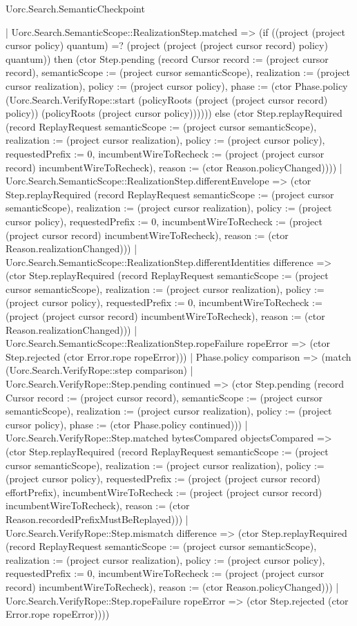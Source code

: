 \begin{lexlean}{Uorc.Search.SemanticCheckpoint}
\begin{semanticmodule}
{      | Uorc.Search.SemanticScope::RealizationStep.matched => (if ((project (project cursor policy) quantum) =? (project (project (project cursor record) policy) quantum)) then (ctor Step.pending (record Cursor {record := (project cursor record), semanticScope := (project cursor semanticScope), realization := (project cursor realization), policy := (project cursor policy), phase := (ctor Phase.policy (Uorc.Search.VerifyRope::start (policyRoots (project (project cursor record) policy)) (policyRoots (project cursor policy))))})) else (ctor Step.replayRequired (record ReplayRequest {semanticScope := (project cursor semanticScope), realization := (project cursor realization), policy := (project cursor policy), requestedPrefix := 0, incumbentWireToRecheck := (project (project cursor record) incumbentWireToRecheck), reason := (ctor Reason.policyChanged)})))
      | Uorc.Search.SemanticScope::RealizationStep.differentEnvelope => (ctor Step.replayRequired (record ReplayRequest {semanticScope := (project cursor semanticScope), realization := (project cursor realization), policy := (project cursor policy), requestedPrefix := 0, incumbentWireToRecheck := (project (project cursor record) incumbentWireToRecheck), reason := (ctor Reason.realizationChanged)}))
      | Uorc.Search.SemanticScope::RealizationStep.differentIdentities difference => (ctor Step.replayRequired (record ReplayRequest {semanticScope := (project cursor semanticScope), realization := (project cursor realization), policy := (project cursor policy), requestedPrefix := 0, incumbentWireToRecheck := (project (project cursor record) incumbentWireToRecheck), reason := (ctor Reason.realizationChanged)}))
      | Uorc.Search.SemanticScope::RealizationStep.ropeFailure ropeError => (ctor Step.rejected (ctor Error.rope ropeError)))
    | Phase.policy comparison => (match (Uorc.Search.VerifyRope::step comparison)
      | Uorc.Search.VerifyRope::Step.pending continued => (ctor Step.pending (record Cursor {record := (project cursor record), semanticScope := (project cursor semanticScope), realization := (project cursor realization), policy := (project cursor policy), phase := (ctor Phase.policy continued)}))
      | Uorc.Search.VerifyRope::Step.matched bytesCompared objectsCompared => (ctor Step.replayRequired (record ReplayRequest {semanticScope := (project cursor semanticScope), realization := (project cursor realization), policy := (project cursor policy), requestedPrefix := (project (project cursor record) effortPrefix), incumbentWireToRecheck := (project (project cursor record) incumbentWireToRecheck), reason := (ctor Reason.recordedPrefixMustBeReplayed)}))
      | Uorc.Search.VerifyRope::Step.mismatch difference => (ctor Step.replayRequired (record ReplayRequest {semanticScope := (project cursor semanticScope), realization := (project cursor realization), policy := (project cursor policy), requestedPrefix := 0, incumbentWireToRecheck := (project (project cursor record) incumbentWireToRecheck), reason := (ctor Reason.policyChanged)}))
      | Uorc.Search.VerifyRope::Step.ropeFailure ropeError => (ctor Step.rejected (ctor Error.rope ropeError))))
}


\end{semanticmodule}
\end{lexlean}
